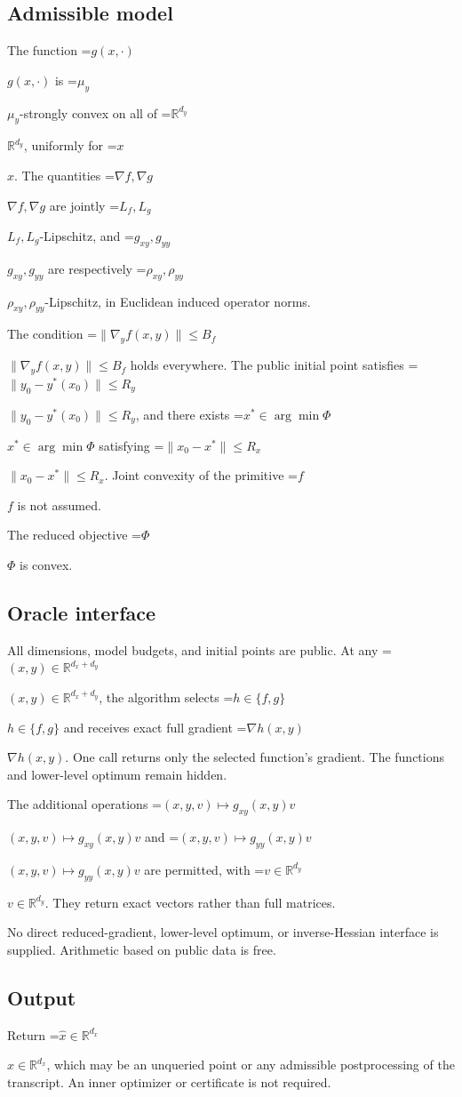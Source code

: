 \documentclass[10pt,a4paper]{article}
\newcommand{\AtlasMath}[1]{\par\begingroup\centering\setbox0=\hbox{$\displaystyle #1$}\ifdim\wd0>1.4\linewidth\typeout{ATLAS WIDE FORMULA: \the\wd0}\fi\ifdim\wd0>\linewidth\resizebox{\linewidth}{!}{\box0}\else\box0\fi\par\endgroup}
\newcommand{\AtlasInlineMath}[1]{\begingroup\setbox0=\hbox{$#1$}\ifdim\wd0>.4\linewidth\endgroup\AtlasMath{#1}\else\endgroup$#1$\fi}
\begin{document}
\subsection{Admissible model}
The function \AtlasInlineMath{g(x,\cdot)} is \AtlasInlineMath{\mu_y}-strongly convex on all of \AtlasInlineMath{\mathbb{R}^{d_y}}, uniformly for \AtlasInlineMath{x}. The quantities \AtlasInlineMath{\nabla f,\nabla g} are jointly \AtlasInlineMath{L_f,L_g}-Lipschitz, and \AtlasInlineMath{g_{xy},g_{yy}} are respectively \AtlasInlineMath{\rho_{xy},\rho_{yy}}-Lipschitz, in Euclidean induced operator norms.

The condition \AtlasInlineMath{\|\nabla_y f(x,y)\|\le B_f} holds everywhere. The public initial point satisfies \AtlasInlineMath{\|y_0-y^*(x_0)\|\le R_y}, and there exists \AtlasInlineMath{x^*\in\arg\min\Phi} satisfying \AtlasInlineMath{\|x_0-x^*\|\le R_x}. Joint convexity of the primitive \AtlasInlineMath{f} is not assumed.

The reduced objective \AtlasInlineMath{\Phi} is convex.

\subsection{Oracle interface}
All dimensions, model budgets, and initial points are public. At any \AtlasInlineMath{(x,y)\in\mathbb{R}^{d_x+d_y}}, the algorithm selects \AtlasInlineMath{h\in\{f,g\}} and receives exact full gradient \AtlasInlineMath{\nabla h(x,y)}. One call returns only the selected function's gradient. The functions and lower-level optimum remain hidden.

The additional operations \AtlasInlineMath{(x,y,v)\mapsto g_{xy}(x,y)v} and \AtlasInlineMath{(x,y,v)\mapsto g_{yy}(x,y)v} are permitted, with \AtlasInlineMath{v\in\mathbb{R}^{d_y}}. They return exact vectors rather than full matrices.

No direct reduced-gradient, lower-level optimum, or inverse-Hessian interface is supplied. Arithmetic based on public data is free.

\subsection{Output}
Return \AtlasInlineMath{\widehat{x}\in\mathbb{R}^{d_x}}, which may be an unqueried point or any admissible postprocessing of the transcript. An inner optimizer or certificate is not required.
\end{document}
